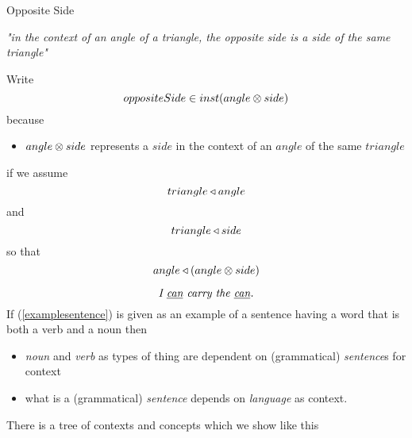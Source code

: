 \begin{frame}{Opposite Side}
\iffalse
{\begin{displaymath}
\begin{array}{c p{0.5cm} c  c} 
                &&\rnode{Bp}{} &                   \\
\rnode{A}{}&                   &                   \\[0.25cm]
                &&             & \rnode{Cp}{} \\
\end{array}
\ncline[nodesep=0pt]{A}{Bp}
\ncput{\rnode{B}{}}
\ncline[nodesep=0pt]{A}{Cp}
\ncput{\rnode{C}{}}
\ncline[nodesep=0pt]{Bp}{Cp}
\ncline[nodesep=0pt]{B}{C}
\nput[labelsep=1pt]{180}{A}{A}
\nput[labelsep=2pt]{80}{Bp}{B'}
\nput[labelsep=1pt]{290}{Cp}{C'}
\nput[labelsep=1pt]{120}{B}{B}
\nput[labelsep=2pt]{260}{C}{C}
\end{displaymath}
}
\fi

\textit{"in the context of an angle of a triangle, the opposite side is a side of the same triangle"}

\medskip
Write 
$$oppositeSide \in inst(angle \otimes side)$$
because
\begin{itemize}
\item $angle \otimes side$ represents a $side$ in the context of an $angle$ of the same $triangle$
\end{itemize}
if we assume
$$triangle \triangleleft angle$$
 and 
$$triangle \triangleleft side$$
so that
$$angle \triangleleft (angle \otimes side)$$
\end{frame}


\begin{frame}
\begin{equation}
\label{examplesentence}
\mbox{\textit{I \underline{can} carry the \underline{can}.}}
\end{equation}
If (\ref{examplesentence}) is given as an example of a sentence having a word that is both a verb and a noun then
\medskip
\begin{itemize}
\item \textit{noun} and \textit{verb} as types of thing are dependent on (grammatical) \textit{sentence}s for context
\item what is a (grammatical) \textit{sentence} depends on \textit{language} as context.
\end{itemize}
There is a tree of contexts and concepts which we show like this

\end{frame}

